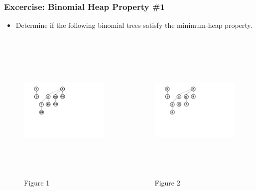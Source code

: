 \documentclass[13pt]{beamer}
\begin{document}
\begin{frame}
\frametitle{Excercise: Binomial Heap Property \#1}
  \begin{itemize}
    \item Determine if the following binomial trees satisfy the minimum-heap property.
  \end{itemize}

  \begin{columns}[T] %
    \begin{column}[T]{6.5cm} %
      \begin{figure}
        \caption{Figure 1}
        \includegraphics[height=7cm]{minheap1.png}
      \end{figure}
      \centering
    \end{column}
    \begin{column}[T]{6.5cm} %
      \begin{figure}
        \caption{Figure 2}
        \includegraphics[height=7cm]{minheap2.png}
      \end{figure}
    \end{column}
  \end{columns}
\end{frame}
\end{document}
